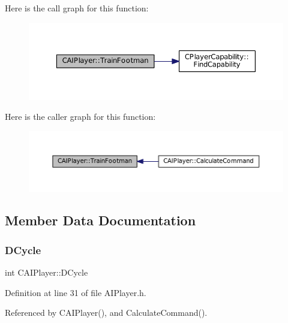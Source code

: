 Here is the call graph for this function\+:\nopagebreak
\begin{figure}[H]
\begin{center}
\leavevmode
\includegraphics[width=350pt]{classCAIPlayer_aa3f9c1d0d449a45a24e065d2086527b0_cgraph}
\end{center}
\end{figure}
Here is the caller graph for this function\+:\nopagebreak
\begin{figure}[H]
\begin{center}
\leavevmode
\includegraphics[width=350pt]{classCAIPlayer_aa3f9c1d0d449a45a24e065d2086527b0_icgraph}
\end{center}
\end{figure}


\subsection{Member Data Documentation}
\hypertarget{classCAIPlayer_adf12a7afe7ea86410b18eff47fa95253}{}\label{classCAIPlayer_adf12a7afe7ea86410b18eff47fa95253} 
\subsubsection{\texorpdfstring{D\+Cycle}{DCycle}}
{\footnotesize\ttfamily int C\+A\+I\+Player\+::\+D\+Cycle\hspace{0.3cm}{\ttfamily [protected]}}



Definition at line 31 of file A\+I\+Player.\+h.



Referenced by C\+A\+I\+Player(), and Calculate\+Command().

